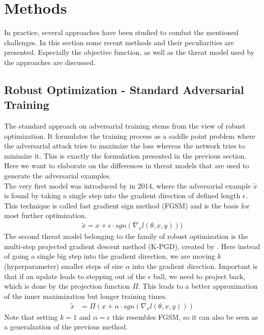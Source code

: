 \documentclass{article}
\begin{document}
\section{Methods}
  
In practice, several approaches have been studied to combat the mentioned challenges. In this section some recent methods and their peculiarities are presented. Especially the objective function, as well as the threat model used by the approaches are discussed.
  
\subsection{Robust Optimization - Standard Adversarial Training} \label{Robust Opti}
  
The standard approach on adversarial training stems from the view of robust optimization. It formulates the training process as a saddle point problem where the adversarial attack tries to maximize the loss whereas the network tries to minimize it. This is exactly the formulation presented in the previous section. Here we want to elaborate on the differences in threat models that are used to generate the adversarial examples. \\
The very first model was introduced by \cite{b9} in 2014, where the adversarial example $\tilde{x}$ is found by taking a single step into the gradient direction of defined length $\epsilon$. This technique is called fast gradient sign method (FGSM) and is the basis for most further optimization.
\begin{align*}
  \tilde{x} = x + \epsilon \cdot sgn(\nabla_x l(\theta,x,y)))
\end{align*}
The second threat model belonging to the family of robust optimization is the multi-step projected gradient descent method (K-PGD), created by \cite{b28}. Here instead of going a single big step into the gradient direction, we are moving $k$ (hyperparameter) smaller steps of size $\alpha$ into the gradient direction. Important is that if an update leads to stepping out of the $\epsilon$ ball, we need to project back, which is done by the projection function $\Pi$. This leads to a better approximation of the inner maximization but longer training times. 
\begin{align*}
    \tilde{x} &= \Pi (x + \alpha \cdot sgn(\nabla_x l(\theta,x,y)))
\end{align*}
Note that setting $k=1$ and $\alpha=\epsilon$ this resembles FGSM, so it can also be seen as a generalzation of the previous method. \\
\end{document}
